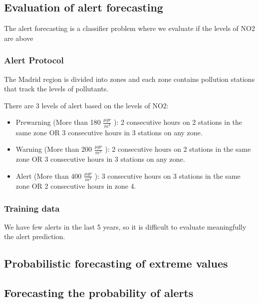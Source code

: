 \subsection{Evaluation of alert forecasting}
\label{sec:eval-extr-value}

The alert forecasting is a classifier problem where we evaluate if the levels of NO2 are above

\subsubsection{Alert Protocol}

The Madrid region is divided into zones and each zone contains pollution stations that track the levels
of pollutants.

There are 3 levels of alert based on the levels of NO2:
\begin{itemize}
  \item Prewarning (More than 180 $\frac{\mu gr}{m^3}$ ): 2 consecutive hours on 2 stations in the same zone OR 3 
  consecutive hours in 3 stations on any zone.
  \item Warning (More than 200 $\frac{\mu gr}{m^3}$ ): 2 consecutive hours on 2 stations in the same zone OR 3 
  consecutive hours in 3 stations on any zone.
  \item Alert (More than 400 $\frac{\mu gr}{m^3}$ ): 3 consecutive hours on 3 stations in the same zone OR 2 
  consecutive hours in zone 4. 
\end{itemize} 

\subsubsection{Training data}
\label{sec:eval-extr-value}

We have few alerts in the last 5 years, so it is difficult to evaluate meaningfully the alert prediction.

\subsection{Probabilistic forecasting of extreme values}
\label{sec:probabilistic}


\subsection{Forecasting the probability of alerts}
\label{sec:alertProb2}